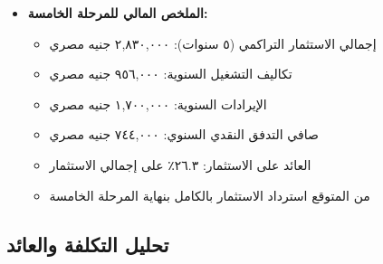 \begin{itemize}
    \item \textbf{الملخص المالي للمرحلة الخامسة:}
    \begin{itemize}
        \item إجمالي الاستثمار التراكمي (٥ سنوات): ٢,٨٣٠,٠٠٠ جنيه مصري
        \item تكاليف التشغيل السنوية: ٩٥٦,٠٠٠ جنيه مصري
        \item الإيرادات السنوية: ١,٧٠٠,٠٠٠ جنيه مصري
        \item صافي التدفق النقدي السنوي: ٧٤٤,٠٠٠ جنيه مصري
        \item العائد على الاستثمار: ٢٦.٣٪ على إجمالي الاستثمار
        \item من المتوقع استرداد الاستثمار بالكامل بنهاية المرحلة الخامسة
    \end{itemize}
\end{itemize}

\subsection{تحليل التكلفة والعائد}

